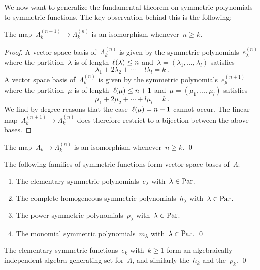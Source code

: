 \documentclass[a4paper,11pt]{scrartcl}
\begin{document}
We now want to generalize the fundamental theorem on symmetric polynomials to symmetric functions.
The key observation behind this is the following:

\begin{proposition}
  \label{sequence stabilizes}
  The map~$\Lambda^{(n+1)}_k \to \Lambda^{(n)}_k$ is an isomorphism whenever~$n \geq k$. 
\end{proposition}

\begin{proof}
  A vector space basis of~$\Lambda^{(n)}_k$ is given by the symmetric polynomials~$e^{(n)}_\lambda$ where the partition~$\lambda$ is of length~$\ell(\lambda) \leq n$ and~$\lambda = (\lambda_1, \dotsc, \lambda_l)$ satisfies
  \[
    \lambda_1 + 2 \lambda_2 + \dotsb + l \lambda_l = k \,.
  \]
  A vector space basis of~$\Lambda^{(n)}_k$ is given by the symmetric polynomials~$e^{(n+1)}_\mu$ where the partition~$\mu$ is of length~$\ell(\mu) \leq n+1$ and~$\mu = (\mu_1, \dotsc, \mu_l)$ satisfies
  \[
    \mu_1 + 2 \mu_2 + \dotsb + l \mu_l = k \,.
  \]
  We find by degree reasons that the case~$\ell(\mu) = n+1$ cannot occur.
  The linear map~$\Lambda^{(n+1)}_k \to \Lambda^{(n)}_k$ does therefore restrict to a bijection between the above bases.
\end{proof}

\begin{corollary}
  \label{iso in each degree for sufficiently large}
  The map~$\Lambda_k \to \Lambda^{(n)}_k$ is an isomorphism whenever~$n \geq k$.
  \qed
\end{corollary}

\begin{corollary}
  The following families of symmetric functions form vector space bases of~$\Lambda$:
  \begin{enumerate}
    \item
      The elementary symmetric polynomials~$e_\lambda$ with~$\lambda \in \mathrm{Par}$.
    \item
      The complete homogeneous symmetric polynomials~$h_\lambda$ with~$\lambda \in \mathrm{Par}$.
    \item
      The power symmetric polynomials~$p_\lambda$ with~$\lambda \in \mathrm{Par}$.
    \item
      The monomial symmetric polynomials~$m_\lambda$ with~$\lambda \in \mathrm{Par}$.
    \qed
  \end{enumerate}
\end{corollary}

\begin{corollary}
  The elementary symmetric functions~$e_k$ with~$k \geq 1$ form an algebraically independent algebra generating set for~$\Lambda$, and similarly the~$h_k$ and the~$p_k$.
  \qed
\end{corollary}
\end{document}

